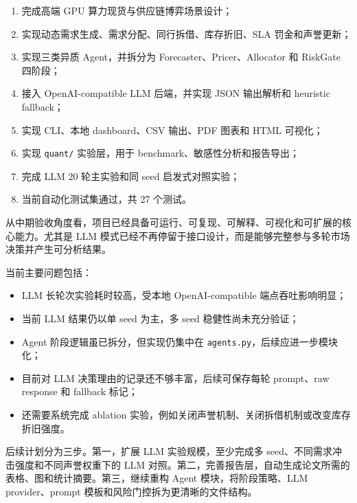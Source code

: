\documentclass[11pt, a4paper]{article}
\makeatletter
\renewcommand\section{\@startsection{section}{1}{\z@}{-1.2em \@plus -0.3em}{0.5em}{\normalfont\Large\bfseries}}
\makeatother
\begin{document}
\begin{enumerate}
    \item 完成高端 GPU 算力现货与供应链博弈场景设计；
    \item 实现动态需求生成、需求分配、同行拆借、库存折旧、SLA 罚金和声誉更新；
    \item 实现三类异质 Agent，并拆分为 Forecaster、Pricer、Allocator 和 RiskGate 四阶段；
    \item 接入 OpenAI-compatible LLM 后端，并实现 JSON 输出解析和 heuristic fallback；
    \item 实现 CLI、本地 dashboard、CSV 输出、PDF 图表和 HTML 可视化；
    \item 实现 \texttt{quant/} 实验层，用于 benchmark、敏感性分析和报告导出；
    \item 完成 LLM 20 轮主实验和同 seed 启发式对照实验；
    \item 当前自动化测试集通过，共 27 个测试。
\end{enumerate}

从中期验收角度看，项目已经具备可运行、可复现、可解释、可视化和可扩展的核心能力。尤其是 LLM 模式已经不再停留于接口设计，而是能够完整参与多轮市场决策并产生可分析结果。

\section{问题与后续计划}

当前主要问题包括：

\begin{itemize}
    \item LLM 长轮次实验耗时较高，受本地 OpenAI-compatible 端点吞吐影响明显；
    \item 当前 LLM 结果仍以单 seed 为主，多 seed 稳健性尚未充分验证；
    \item Agent 阶段逻辑虽已拆分，但实现仍集中在 \texttt{agents.py}，后续应进一步模块化；
    \item 目前对 LLM 决策理由的记录还不够丰富，后续可保存每轮 prompt、raw response 和 fallback 标记；
    \item 还需要系统完成 ablation 实验，例如关闭声誉机制、关闭拆借机制或改变库存折旧强度。
\end{itemize}

后续计划分为三步。第一，扩展 LLM 实验规模，至少完成多 seed、不同需求冲击强度和不同声誉权重下的 LLM 对照。第二，完善报告层，自动生成论文所需的表格、图和统计摘要。第三，继续重构 Agent 模块，将阶段策略、LLM provider、prompt 模板和风险门控拆为更清晰的文件结构。
\end{document}
